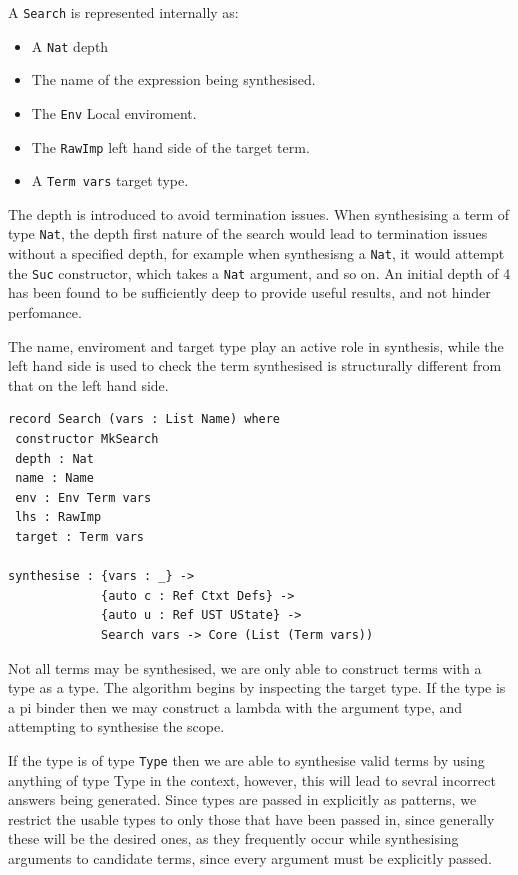 \documentclass[a4paper]{article}
\begin{document}
A \texttt{Search} is represented internally as: 
\begin{itemize}
\item A \texttt{Nat} depth
\item The name of the expression being synthesised.
\item The \texttt{Env} Local enviroment.
\item The \texttt{RawImp} left hand side of the target term.
\item A \texttt{Term vars} target type.
\end{itemize}

The depth is introduced to avoid termination issues. When synthesising a term of type \texttt{Nat}, the depth first nature of the 
search would lead to termination issues without a specified depth, for example when synthesisng a \texttt{Nat}, it would attempt 
the \texttt{Suc} constructor, which takes a \texttt{Nat} argument, and so on. An initial depth of 4 has been found to be sufficiently deep 
to provide useful results, and not hinder perfomance. 

The name, enviroment and target type play an active role in synthesis, while the left hand side is used to check the term 
synthesised is structurally different from that on the left hand side. 

\begin{center}
\begin{verbatim}
record Search (vars : List Name) where
 constructor MkSearch
 depth : Nat
 name : Name
 env : Env Term vars
 lhs : RawImp
 target : Term vars 

synthesise : {vars : _} -> 
			 {auto c : Ref Ctxt Defs} -> 
			 {auto u : Ref UST UState} ->
			 Search vars -> Core (List (Term vars))

\end{verbatim}
\end{center}


Not all terms may be synthesised, we are only able to construct terms with a type as a type. The algorithm begins by 
inspecting the target type. If the type is a pi binder then we may construct a lambda with  
the argument type, and attempting to synthesise the scope.

If the type is of type \texttt{Type} then we are able to synthesise valid terms by using anything of type Type in the context,
however, this will lead to sevral incorrect answers being generated. Since types are passed in explicitly as patterns, 
we restrict the usable types to only those that have been passed in, since generally these will be the desired ones, 
as they frequently occur while synthesising arguments to candidate terms, since every argument must be explicitly passed.
\end{document}
